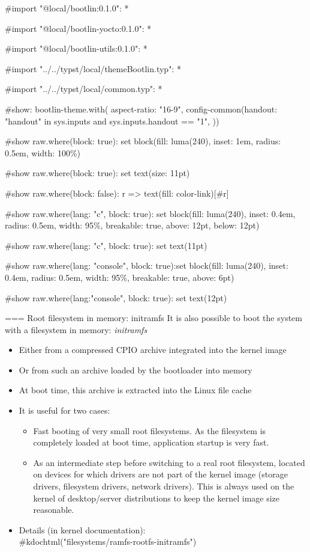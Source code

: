 #import "@local/bootlin:0.1.0": *

#import "@local/bootlin-yocto:0.1.0": *

#import "@local/bootlin-utils:0.1.0": *

#import "../../typst/local/themeBootlin.typ": *

#import "../../typst/local/common.typ": *

#show: bootlin-theme.with( aspect-ratio: "16-9", config-common(handout: "handout" in sys.inputs and sys.inputs.handout == "1", ))

#show raw.where(block: true): set block(fill: luma(240), inset: 1em, radius: 0.5em, width: 100\%)

#show raw.where(block: true): set text(size: 11pt)

#show raw.where(block: false): r => text(fill: color-link)[#r]

#show raw.where(lang: "c", block: true): set block(fill: luma(240), inset: 0.4em, radius: 0.5em, width: 95\%, breakable: true, above: 12pt, below: 12pt)

#show raw.where(lang: "c", block: true): set text(11pt)

#show raw.where(lang: "console", block: true):set block(fill: luma(240), inset: 0.4em, radius: 0.5em, width: 95\%, breakable: true, above: 6pt)

#show raw.where(lang:"console", block: true): set text(12pt)

=== Root filesystem in memory: initramfs
  It is also possible to boot the system with a filesystem in memory:
  {\em initramfs}
  \begin{itemize}
  \item Either from a compressed CPIO archive integrated into the kernel image
  \item Or from such an archive loaded by the bootloader into memory
  \item At boot time, this archive is extracted into the Linux file cache
  \item It is useful for two cases:
    \begin{itemize}
    \item Fast booting of very small root filesystems. As the
      filesystem is completely loaded at boot time, application
      startup is very fast.
    \item As an intermediate step before switching to a real root
      filesystem, located on devices for which drivers are not part of the
      kernel image (storage drivers, filesystem drivers,
      network drivers). This is always used on the kernel of
      desktop/server distributions to keep the kernel image size
      reasonable.
    \end{itemize}
  \item Details (in kernel documentation): \\
    #kdochtml("filesystems/ramfs-rootfs-initramfs")\\
  \end{itemize}


